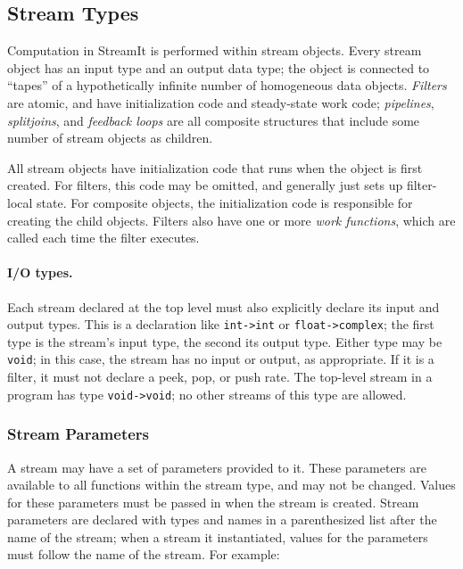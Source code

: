 \documentclass[11pt]{article}
\begin{document}
\subsection{Stream Types}

Computation in StreamIt is performed within stream objects.  Every
stream object has an input type and an output data type; the object is
connected to ``tapes'' of a hypothetically infinite number of
homogeneous data objects.  \emph{Filters} are atomic, and have
initialization code and steady-state work code; \emph{pipelines},
\emph{splitjoins}, and \emph{feedback loops} are all composite
structures that include some number of stream objects as children.

All stream objects have initialization code that runs when the object
is first created.  For filters, this code may be omitted, and
generally just sets up filter-local state.  For composite objects, the
initialization code is responsible for creating the child objects.
Filters also have one or more \emph{work functions}, which are called
each time the filter executes.

\paragraph{I/O types.}  Each stream declared at the top level must
also explicitly declare its input and output types.  This is a
declaration like \lstinline|int->int| or \lstinline|float->complex|;
the first type is the stream's input type, the second its output type.
Either type may be \lstinline|void|; in this case, the stream has no
input or output, as appropriate.  If it is a filter, it must not
declare a peek, pop, or push rate.  The top-level stream in a
program has type \lstinline|void->void|; no other streams of this type
are allowed.

\subsubsection{Stream Parameters}

A stream may have a set of parameters provided to it.  These
parameters are available to all functions within the stream type, and
may not be changed.  Values for these parameters must be passed in
when the stream is created.  Stream parameters are declared with types
and names in a parenthesized list after the name of the stream; when a
stream it instantiated, values for the parameters must follow the name
of the stream.  For example:
\end{document}
